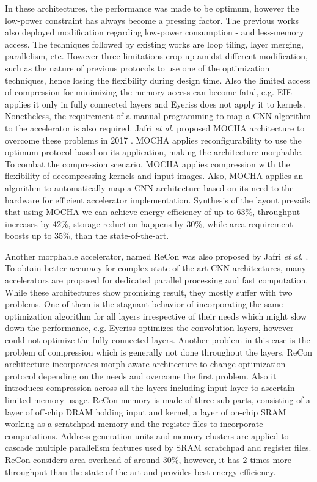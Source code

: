 \documentclass[journal]{IEEEtran}
\begin{document}
\par In these architectures, the performance was made to be optimum, however the low-power constraint has always become a pressing factor. The previous works also deployed modification regarding low-power consumption \cite{paper20}-\hspace{-0.1em}\cite{paper25} and less-memory access. The techniques followed by existing works are loop tiling, layer merging, parallelism, etc. However three limitations crop up amidst different modification, such as the nature of previous protocols to use one of the optimization techniques, hence losing the flexibility during design time. Also the limited access of compression for minimizing the memory access can become fatal, e.g. EIE applies it only in fully connected layers and Eyeriss does not apply it to kernels. Nonetheless, the requirement of a manual programming to map a CNN algorithm to the accelerator is also required. Jafri \textit{et al.} proposed MOCHA architecture to overcome these problems in 2017 \cite{paper26}. MOCHA applies reconfigurability to use the optimum protocol based on its application, making the architecture morphable. To combat the compression scenario, MOCHA applies compression with the flexibility of decompressing kernels and input images. Also, MOCHA applies an algorithm to automatically map a CNN architecture based on its need to the hardware for efficient accelerator implementation. Synthesis of the layout prevails that using MOCHA we can achieve energy efficiency of up to 63\%, throughput increases by 42\%, storage reduction happens by 30\%, while area requirement boosts up to 35\%, than the state-of-the-art. 

\par Another morphable accelerator, named ReCon was also proposed by Jafri \textit{et al.} \cite{paper27}. To obtain better accuracy for complex state-of-the-art CNN architectures, many accelerators are proposed for dedicated parallel processing and fast computation. While these architectures show promising result, they mostly suffer with two problems. One of them is the stagnant behavior of incorporating the same optimization algorithm for all layers irrespective of their needs which might slow down the performance, e.g. Eyeriss optimizes the convolution layers, however could not optimize the fully connected layers. Another problem in this case is the problem of compression which is generally not done throughout the layers. ReCon architecture incorporates morph-aware architecture to change optimization protocol depending on the needs and overcome the first problem. Also it introduces compression across all the layers including input layer to ascertain limited memory usage. ReCon memory is made of three sub-parts, consisting of a layer of off-chip DRAM holding input and kernel, a layer of on-chip SRAM working as a scratchpad memory and the register files to incorporate computations. Address generation units and memory clusters are applied to cascade multiple parallelism features used by SRAM scratchpad and register files. ReCon considers area overhead of around 30\%, however, it has 2 times more throughput than the state-of-the-art and provides best energy efficiency.
\end{document}
